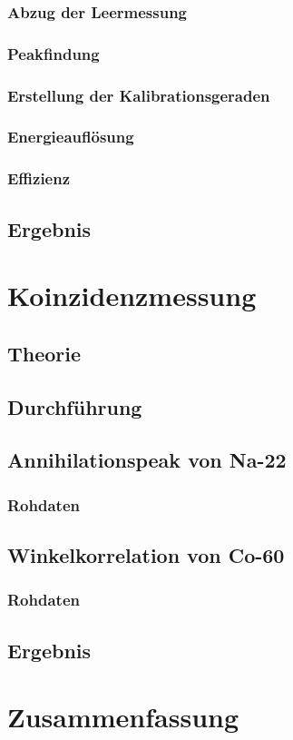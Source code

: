 \documentclass{../Misc/MontavonLaTeX/Montavon}
\begin{document}
\subsubsection{Abzug der Leermessung}
\subsubsection{Peakfindung}
\subsubsection{Erstellung der Kalibrationsgeraden}
\subsubsection{Energieauflösung}
\subsubsection{Effizienz}

\subsection{Ergebnis}

\section{Koinzidenzmessung}
\subsection{Theorie}
\subsection{Durchführung}


\subsection{Annihilationspeak von Na-22}
\subsubsection{Rohdaten}


\subsection{Winkelkorrelation von Co-60}
\subsubsection{Rohdaten}

\subsection{Ergebnis}

\section{Zusammenfassung}
\end{document}
